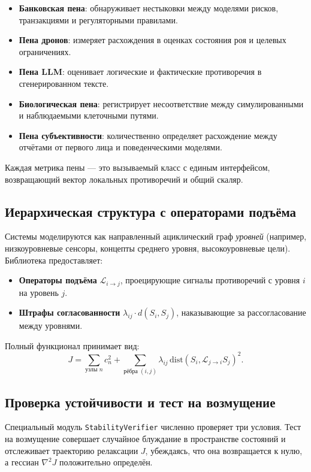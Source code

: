 \documentclass[11pt,a4paper]{article}
\begin{document}
\begin{itemize}
    \item \textbf{Банковская пена}: обнаруживает нестыковки между моделями рисков, транзакциями и регуляторными правилами.
    \item \textbf{Пена дронов}: измеряет расхождения в оценках состояния роя и целевых ограничениях.
    \item \textbf{Пена LLM}: оценивает логические и фактические противоречия в сгенерированном тексте.
    \item \textbf{Биологическая пена}: регистрирует несоответствие между симулированными и наблюдаемыми клеточными путями.
    \item \textbf{Пена субъективности}: количественно определяет расхождение между отчётами от первого лица и поведенческими моделями.
\end{itemize}

Каждая метрика пены — это вызываемый класс с единым интерфейсом, возвращающий вектор локальных противоречий и общий скаляр.

\subsection{Иерархическая структура с операторами подъёма}
Системы моделируются как направленный ациклический граф \textit{уровней} (например, низкоуровневые сенсоры, концепты среднего уровня, высокоуровневые цели). Библиотека предоставляет:

\begin{itemize}
    \item \textbf{Операторы подъёма} $\mathcal{L}_{i\to j}$, проецирующие сигналы противоречий с уровня $i$ на уровень $j$.
    \item \textbf{Штрафы согласованности} $\lambda_{ij} \cdot d(S_i, S_j)$, наказывающие за рассогласование между уровнями.
\end{itemize}

Полный функционал принимает вид:
\begin{equation}
J = \sum_{\text{узлы }n} c_n^2 + \sum_{\text{рёбра }(i,j)} \lambda_{ij} \, \text{dist}(S_i, \mathcal{L}_{j\to i} S_j)^2.
\end{equation}

\subsection{Проверка устойчивости и тест на возмущение}
Специальный модуль \texttt{StabilityVerifier} численно проверяет три условия. Тест на возмущение совершает случайное блуждание в пространстве состояний и отслеживает траекторию релаксации $J$, убеждаясь, что она возвращается к нулю, а гессиан $\nabla^2 J$ положительно определён.
\end{document}

